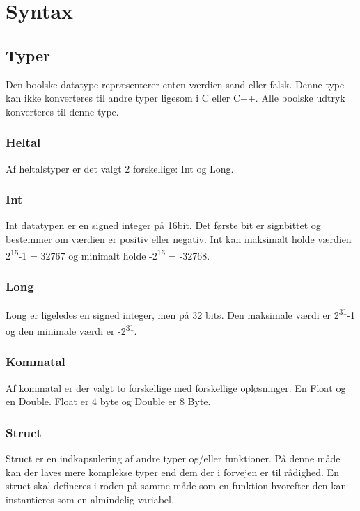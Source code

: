 \section{Syntax}\label{sec:Syntax}


\subsection{Typer}

Den boolske datatype repræsenterer enten værdien sand eller falsk. Denne type kan ikke konverteres til andre typer ligesom i C eller C++. Alle boolske udtryk konverteres til denne type.

\subsubsection{Heltal}
Af heltalstyper er det valgt 2 forskellige: Int og Long. 

\subsubsection{Int}
Int datatypen er en signed integer på 16bit. Det første bit er signbittet og bestemmer om værdien er positiv eller negativ. Int kan maksimalt holde værdien 2\textsuperscript{15}-1 = 32767 og minimalt holde -2\textsuperscript{15} = -32768.

\subsubsection{Long}
Long er ligeledes en signed integer, men på 32 bits. Den maksimale værdi er 2\textsuperscript{31}-1 og den minimale værdi er -2\textsuperscript{31}.

\subsubsection{Kommatal}
Af kommatal er der valgt to forskellige med forskellige opløsninger. En Float og en Double. Float er 4 byte og Double er 8 Byte.

\subsubsection{Struct}
Struct er en indkapsulering af andre typer og/eller funktioner. På denne måde kan der laves mere komplekse typer end dem der i forvejen er til rådighed. En struct skal defineres i roden på samme måde som en funktion hvorefter den kan instantieres som en almindelig variabel.

